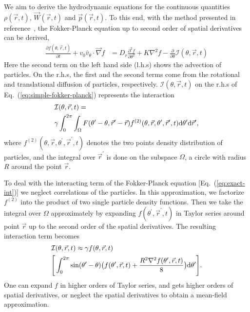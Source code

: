 \documentclass[reprint,floatfix,amsmath,amssymb,aps,pre,showkeys,showpacs,superscriptaddress]{revtex4-1}
\newcommand{\grad}{\vec{\nabla}}
\newcommand{\Dif}[2]{\frac{\partial #1}{\partial #2}}
\newcommand{\intr}{\mathcal{I}}
\newcommand{\p}{p}
\newcommand{\vp}{\vec{\p}}
\newcommand{\w}{W}
\newcommand{\vw}{\vec{\w}}
\newcommand{\dd}{{\rm d}}
\newcommand{\req}[1]{Eq.~(\ref{#1})}
\begin{document}
We aim to derive the hydrodynamic equations for the continuous quantities $\rho(\vec{r},t)$, $\vw(\vec{r},t)$ and $\vp(\vec{r},t)$. To this end, with the method presented in reference~\cite{Dean1996}, the Fokker-Planck equation up to second order of spatial derivatives can be derived,
\begin{equation}
\begin{aligned}
\Dif{{f} (\theta,\vec{r},t)}{t} + v_0 \hat{v}_{\theta} \cdot \grad f &= D_r \frac{\partial^2 f}{\partial \theta^2} + K \nabla^2 f -\frac{\partial}{\partial \theta} \intr (\theta,\vec{r},t)
\end{aligned}
\label{eq:simple-fokker-planck}
\end{equation}
Here the second term on the left hand side (l.h.s) shows the advection of particles. On the r.h.s, the first and the second terms come from the rotational and translational diffusion of particles, respectively. $\intr(\theta,\vec{r},t)$ on the r.h.s of \req{eq:simple-fokker-planck} represents the interaction
\begin{equation}
\begin{aligned}
&\intr(\theta,\vec{r},t) = \\
&\gamma \int_0^{2 \pi} \int_{\Omega} F(\theta^\prime - \theta,\vec{r}^\prime - \vec{r}) f^{(2)}(\theta,\vec{r},\theta^{\prime},\vec{r}^\prime,t)  \dd \theta^{\prime} \dd \vec{r}^\prime,
\end{aligned}
\label{eq:exact-int}
\end{equation}
where $f^{(2)}(\theta,\vec{r},\theta^{\prime},\vec{r}^\prime,t)$ denotes the two points density distribution of particles, and the integral over $\vec{r}^\prime$ is done on the subspace $\Omega$, a circle with radius $R$ around the point $\vec{r}$.

To deal with the interacting term of the Fokker-Planck equation [\req{eq:exact-int}] we  neglect correlations of the particles. In this approximation, we factorize $f^{(2)}$ into the product of two single particle density functions. Then we take the integral over $\Omega$ approximately by expanding $f(\theta^\prime,\vec{r}^\prime, t)$ in Taylor series around point $\vec{r}$ up to the second order of the spatial derivatives. The resulting interaction term becomes
\begin{equation}
\begin{aligned}
&\intr(\theta,\vec{r},t) \approx \gamma f(\theta,\vec{r},t) \\
&\Bigg[ \int_0^{2 \pi} \sin(\theta^{\prime} - \theta) \big( f(\theta^{\prime},\vec{r},t) + \frac{R^2 \nabla^2 f(\theta^{\prime}, \vec{r}, t)}{8} \big) \dd \theta^{\prime} \Bigg].
\end{aligned}
\label{eq:fokker-planck-int}
\end{equation}
One can expand $f$ in higher orders of Taylor series, and gets higher orders of spatial derivatives, or neglect the spatial derivatives to obtain a mean-field approximation.
\end{document}
